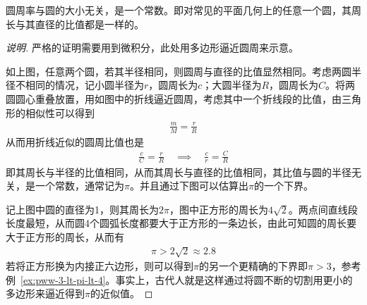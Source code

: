 \begin{example}[$\pi$是个常数]
  圆周率与圆的大小无关，是一个常数。即对常见的平面几何上的任意一个圆，其周长与其直径的比值都是一样的。
\end{example}
\begin{proof}[说明]
  严格的证明需要用到微积分，此处用多边形逼近圆周来示意。
  \begin{center}
  \end{center}
  如上图，任意两个圆，若其半径相同，则圆周与直径的比值显然相同。考虑两圆半径不相同的情况，记小圆半径为$r$，圆周长为$c$；大圆半径为$R$，圆周长为$C$。将两圆圆心重叠放置，用如图中的折线逼近圆周，考虑其中一个折线段的比值，由三角形的相似性可以得到
  \begin{align*}
    \frac{m}{M} = \frac{r}{R}
  \end{align*}
  从而用折线近似的圆周比值也是
  \begin{align*}
    \frac{c}{C}=\frac{r}{R} \quad \implies \quad  \frac{c}{r} = \frac{C}{R}
  \end{align*}
  即其周长与半径的比值相同，从而其周长与直径的比值相同，其比值与圆的半径无关，是一个常数，通常记为$\pi$。并且通过下图可以估算出$\pi$的一个下界。
  \begin{center}
  \end{center}
  记上图中圆的直径为1，则其周长为$2\pi$，图中正方形的周长为$4\sqrt2$。两点间直线段长度最短，从而圆4个圆弧长度都要大于正方形的一条边长，由此可知圆的周长要大于正方形的周长，从而有
  \begin{align*}
    \pi>2\sqrt2\approx 2.8
  \end{align*}
  若将正方形换为内接正六边形，则可以得到$\pi$的另一个更精确的下界即$\pi>3$，参考例~\ref{ex:pww-3-lt-pi-lt-4}。事实上，古代人就是这样通过将圆不断的切割用更小的多边形来逼近得到$\pi$的近似值。
\end{proof}

